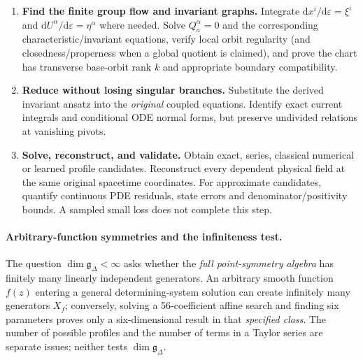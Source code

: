 \documentclass[12pt,a4paper,oneside]{report}
\numberwithin{equation}{chapter}
\theoremstyle{remark}\newtheorem{remark}[theorem]{Remark}
\begin{document}
\begin{enumerate}
   A one-dimensional optimal system chooses one representative from each
   adjoint equivalence class of \emph{one-dimensional subalgebras}. This
   organizes classical one-parameter similarity solutions for $(1+1)$D
   equations. In $(2+1)$D, a single transverse generator leaves
   \emph{two} independent variables and usually another PDE; direct
   reduction to an ODE requires a \emph{rank-two} subgroup, hence the
   classification of suitable \emph{two-dimensional subalgebras} (or
   a verified chain of further reductions). An optimal system need not
   be a finite list: continuous parameters may remain.
 \item \textbf{Find the finite group flow and invariant graphs.}
   Integrate $\mathrm dx^i/\mathrm d\varepsilon=\xi^i$ and
   $\mathrm dU^\alpha/\mathrm d\varepsilon=\eta^\alpha$ where needed.
   Solve $Q^\alpha_a=0$ and the corresponding characteristic/invariant
   equations, verify local orbit regularity (and closedness/properness
   when a global quotient is claimed), and prove the chart has
   transverse base-orbit rank $k$ and appropriate boundary compatibility.
 \item \textbf{Reduce without losing singular branches.}
   Substitute the derived invariant ansatz into the \emph{original}
   coupled equations. Identify exact current integrals and conditional
   ODE normal forms, but preserve undivided relations at vanishing pivots.
 \item \textbf{Solve, reconstruct, and validate.}
   Obtain exact, series, classical numerical or learned profile candidates.
   Reconstruct every dependent physical field at the same original
   spacetime coordinates. For approximate candidates, quantify continuous
   PDE residuals, state errors and denominator/positivity bounds. A sampled
   small loss does not complete this step.
\end{enumerate}

\paragraph{Arbitrary-function symmetries and the infiniteness test.}
The question $\dim\mathfrak g_\Delta<\infty$ asks whether the \emph{full
point-symmetry algebra} has finitely many linearly independent generators.
An arbitrary smooth function $f(z)$ entering a general determining-system
solution can create infinitely many generators $X_f$; conversely, solving a
56-coefficient affine search and finding six parameters proves only a
six-dimensional result in that \emph{specified class}. The number of possible profiles and the number of terms in a Taylor
series are separate issues; neither tests $\dim\mathfrak g_\Delta$.
\end{document}
